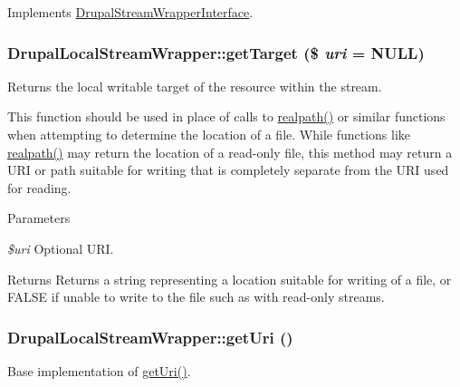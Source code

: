 Implements \hyperlink{interfaceDrupalStreamWrapperInterface_a7c239b7827b124425e655deb257d34b7}{DrupalStreamWrapperInterface}.\hypertarget{classDrupalLocalStreamWrapper_a69cf60b75486daa829b9563ab8a0fa49}{
\subsubsection[{getTarget}]{\setlength{\rightskip}{0pt plus 5cm}DrupalLocalStreamWrapper::getTarget (\$ {\em uri} = {\ttfamily NULL})}}
\label{classDrupalLocalStreamWrapper_a69cf60b75486daa829b9563ab8a0fa49}
Returns the local writable target of the resource within the stream.

This function should be used in place of calls to \hyperlink{classDrupalLocalStreamWrapper_a61f0d0ef6a489e3fca2152eb64174237}{realpath()} or similar functions when attempting to determine the location of a file. While functions like \hyperlink{classDrupalLocalStreamWrapper_a61f0d0ef6a489e3fca2152eb64174237}{realpath()} may return the location of a read-\/only file, this method may return a URI or path suitable for writing that is completely separate from the URI used for reading.


\begin{DoxyParams}{Parameters}
\item[{\em \$uri}]Optional URI.\end{DoxyParams}
\begin{DoxyReturn}{Returns}
Returns a string representing a location suitable for writing of a file, or FALSE if unable to write to the file such as with read-\/only streams. 
\end{DoxyReturn}
\hypertarget{classDrupalLocalStreamWrapper_a8dc69c121105a00949acfdcce0474aaa}{
\subsubsection[{getUri}]{\setlength{\rightskip}{0pt plus 5cm}DrupalLocalStreamWrapper::getUri ()}}
\label{classDrupalLocalStreamWrapper_a8dc69c121105a00949acfdcce0474aaa}
Base implementation of \hyperlink{classDrupalLocalStreamWrapper_a8dc69c121105a00949acfdcce0474aaa}{getUri()}. 

